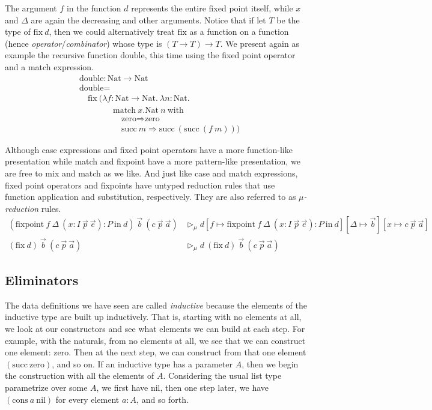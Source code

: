 \documentclass{report}
\newcommand{\Nat}{\const{Nat}}
\newcommand{\zero}{\const{zero}}
\renewcommand{\succ}{\const{succ}}
\newcommand{\nil}{\const{nil}}
\newcommand{\cons}{\const{cons}}
\newcommand{\const}[1]{\text{#1}}
\newcommand{\match}{\const{match}}
\newcommand{\with}{\const{with}}
\newcommand{\inn}{\const{in}}
\newcommand{\fixpoint}{\const{fixpoint}}
\newcommand{\fix}{\const{fix}}
\begin{document}
The argument $f$ in the function $d$ represents the entire fixed point itself, while $x$ and $\Delta$ are again the decreasing and other arguments. Notice that if let $T$ be the type of $\fix ~ d$, then we could alternatively treat $\fix$ as a function on a function (hence \emph{operator}/\emph{combinator}) whose type is $(T \to T) \to T$. We present again as example the recursive function $\const{double}$, this time using the fixed point operator and a match expression.
%
\begin{align*}
    &\const{double} : \Nat \to \Nat \\
    &\const{double} = \\
    &\quad \fix ~ (\lambda f : \Nat \to \Nat. ~ \lambda n: \Nat. \\
    &\qquad\qquad \match ~ x.\Nat ~ n ~ \with \\
    &\quad\qquad\qquad \zero \Rightarrow \zero \\
    &\quad\qquad\qquad \succ ~ m \Rightarrow \succ ~ (\succ ~ (f ~ m)))
\end{align*}

Although case expressions and fixed point operators have a more function-like presentation while match and fixpoint have a more pattern-like presentation, we are free to mix and match as we like. And just like case and match expressions, fixed point operators and fixpoints have untyped reduction rules that use function application and substitution, respectively. They are also referred to as \emph{$\mu$-reduction} rules.
%
\begin{align*}
    (\fixpoint ~ f ~ \Delta ~ (x : I ~ \Vec{p} ~ \Vec{e}) : P ~ \inn ~ d) ~ \Vec{b} ~ (c ~ \Vec{p} ~ \Vec{a}) &\rhd_{\mu} d[f \mapsto \fixpoint ~ f ~ \Delta ~ (x : I ~ \Vec{p} ~ \Vec{e}) : P ~ \inn ~ d][\Delta \mapsto \Vec{b}][x \mapsto c ~ \Vec{p} ~ \Vec{a}] \\
    (\fix ~ d) ~ \Vec{b} ~ (c ~ \Vec{p} ~ \Vec{a}) &\rhd_{\mu} d ~ (\fix ~ d) ~ \Vec{b} ~ (c ~ \Vec{p} ~ \Vec{a})
\end{align*}

\subsection{Eliminators}

The data definitions we have seen are called \emph{inductive} because the elements of the inductive type are built up inductively. That is, starting with no elements at all, we look at our constructors and see what elements we can build at each step. For example, with the naturals, from no elements at all, we see that we can construct one element: $\zero$. Then at the next step, we can construct from that one element $(\succ ~ \zero)$, and so on. If an inductive type has a parameter $A$, then we begin the construction with all the elements of $A$. Considering the usual list type parametrize over some $A$, we first have $\nil$, then one step later, we have $(\cons ~ a ~ \nil)$ for every element $a : A$, and so forth.
\end{document}
